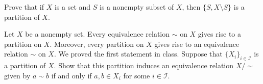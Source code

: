 \documentclass[11pt,letterpaper]{article}
\begin{document}
\newpage





 Prove that if $X$ is a set and $S$ is a nonempty subset of $X$, then $\{ S, X \setminus S \}$ is a partition of $X$. \pspace





\newpage





 Let $X$ be a nonempty set. Every equivalence relation $\sim$ on $X$ gives rise to a partition on $X$. Moreover, every partition on $X$ gives rise to an equivalence relation $\sim$ on $X$. We proved the first statement in class. Suppose that $\{ X_i \}_{i \in \mathcal{I}}$ is a partition of $X$. Show that this partition induces an equivalence relation $X/\sim$ given by $a \sim b$ if and only if $a, b \in X_i$ for some $i \in \mathcal{I}$. \pspace
\end{document}
